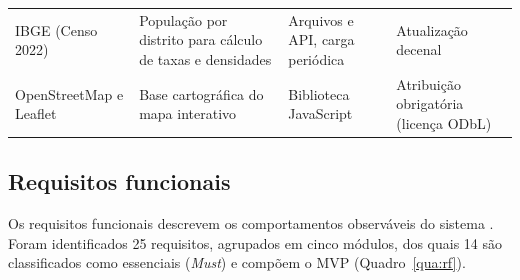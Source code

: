 \begin{longtable}{L{3.1cm}L{4.3cm}L{2.3cm}L{4.4cm}}
	IBGE (Censo 2022)                     & População por distrito para cálculo de taxas e densidades                                            & Arquivos e API, carga periódica    & Atualização decenal                                           \\
	OpenStreetMap e Leaflet               & Base cartográfica do mapa interativo                                                                 & Biblioteca JavaScript              & Atribuição obrigatória (licença ODbL)                         \\
\end{longtable}
\vspace{-0.4cm}

\subsection{Requisitos funcionais}

Os requisitos funcionais descrevem os comportamentos observáveis do sistema \cite{sommerville2018}. Foram identificados 25 requisitos, agrupados em cinco módulos, dos quais 14 são classificados como essenciais (\emph{Must}) e compõem o MVP (Quadro~\ref{qua:rf}).

